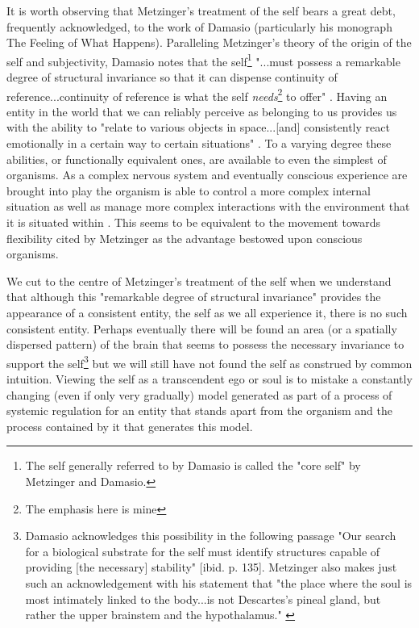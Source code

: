 It is worth observing that Metzinger's treatment of the self bears a great debt, frequently acknowledged, to the work of Damasio (particularly his monograph The Feeling of What Happens). Paralleling Metzinger's theory of the origin of the self and subjectivity, Damasio notes that the self\footnote{The self generally referred to by Damasio is called the "core self" by Metzinger and Damasio.} "...must possess a remarkable degree of structural invariance so that it can dispense continuity of reference...continuity of reference is what the self \emph{needs}\footnote{The emphasis here is mine} to offer" \cite[p. 135]{damasio2000}. Having an entity in the world that we can reliably perceive as belonging to us provides us with the ability to "relate to various objects in space...[and] consistently react emotionally in a certain way to certain situations" \cite[p. 135]{damasio2000}. To a varying degree these abilities, or functionally equivalent ones, are available to even the simplest of organisms. As a complex nervous system and eventually conscious experience are brought into play the organism is able to control a more complex internal situation as well as manage more complex interactions with the environment that it is situated within \cite[p. 139]{damasio2000}. This seems to be equivalent to the movement towards flexibility cited by Metzinger as the advantage bestowed upon conscious organisms.

We cut to the centre of Metzinger's treatment of the self when we understand that although this "remarkable degree of structural invariance" provides the appearance of a consistent entity, the self as we all experience it, there is no such consistent entity. Perhaps eventually there will be found an area (or a spatially dispersed pattern) of the brain that seems to possess the necessary invariance to support the self\footnote{Damasio acknowledges this possibility in the following passage "Our search for a biological substrate for the self must identify structures capable of providing [the necessary] stability" [ibid. p. 135]. Metzinger also makes just such an acknowledgement with his statement that "the place where the soul is most intimately linked to the body...is not Descartes's pineal gland, but rather the upper brainstem and the hypothalamus." \cite[p. 292]{metzinger2003}} but we will still have not found the self as construed by common intuition. Viewing the self as a transcendent ego or soul is to mistake a constantly changing (even if only very gradually) model generated as part of a process of systemic regulation for an entity that stands apart from the organism and the process contained by it that generates this model.

